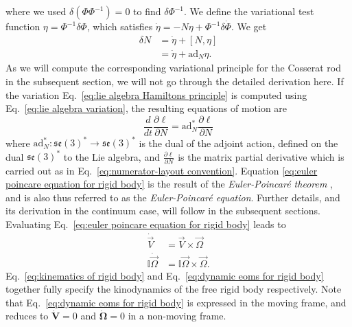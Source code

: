 where we used $\delta (\Phi \Phi^{-1}) = 0$ to find $\delta \Phi^{-1}$. We define the variational test function $\eta = \Phi^{-1} \delta \Phi$, which satisfies $\dot{\eta} = - N \eta + \Phi^{-1} \delta \dot{\Phi}$. We get
\begin{equation} \label{eq:lie algebra variation}
\begin{aligned}
\delta N & = \dot{\eta} + [N, \eta] \\
& = \dot{\eta} + \text{ad}_N \eta.
\end{aligned}
\end{equation}
As we will compute the corresponding variational principle for the Cosserat rod in the subsequent section, we will not go through the detailed derivation here. If the variation Eq.~\ref{eq:lie algebra Hamiltons principle} is computed using Eq.~\ref{eq:lie algebra variation}, the resulting equations of motion are
\begin{equation} \label{eq:euler poincare equation for rigid body}
\frac{d}{dt} \frac{\partial \ell}{\partial N} = \text{ad}_N^* \frac{\partial \ell}{\partial N}
\end{equation}
where $\text{ad}^*_N : \mathfrak{se}(3)^* \to \mathfrak{se}(3)^*$ is the dual of the adjoint action, defined on the dual $\mathfrak{se}(3)^*$ to the Lie algebra, and $\frac{\partial \ell}{\partial N}$ is the matrix partial derivative which is carried out as in Eq.~\ref{eq:numerator-layout convention}. Equation \ref{eq:euler poincare equation for rigid body} is the result of the \textit{Euler-Poincaré theorem} \citep{marleHenriPoincareNote2013a, marsdenIntroductionMechanicsSymmetry2013, poincareFormeNouvelleEquations1901}, and is also thus referred to as the \textit{Euler-Poincaré equation}. Further details, and its derivation in the continuum case, will follow in the subsequent sections. Evaluating Eq.~\ref{eq:euler poincare equation for rigid body} leads to
\begin{subequations} \label{eq:dynamic eoms for rigid body}
\begin{align} 
\dot{\vec{V}} & = \vec{V} \times \vec{\Omega} \label{eq:V rigid body equation} \\
\mathbb{I} \dot{\vec{\Omega}} & = \mathbb{I} \vec{\Omega} \times \vec{\Omega}.
\end{align}
\end{subequations}
Eq.~\ref{eq:kinematics of rigid body} and Eq.~\ref{eq:dynamic eoms for rigid body} together fully specify the kinodynamics of the free rigid body respectively. Note that Eq.~\ref{eq:dynamic eoms for rigid body} is expressed in the moving frame, and reduces to $\dot{\mathbf{V}} = 0$ and $\dot{\boldsymbol{\Omega}} = 0$ in a non-moving frame.


